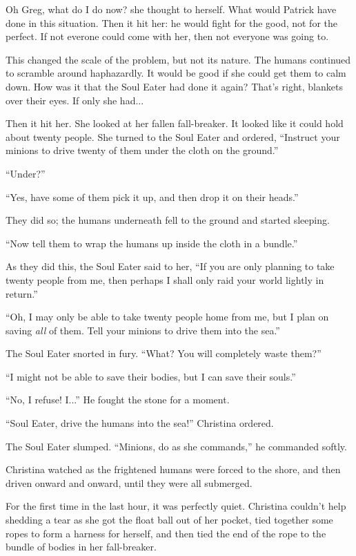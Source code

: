 \documentclass[showtrims,b6paper,draft,10pt]{memoir}
\begin{document}
Oh Greg, what do I do now?  she thought to herself.  What would Patrick have done in this situation.  Then it hit her:  he would fight for the good, not for the perfect.  If not everone could come with her, then not everyone was going to.

This changed the scale of the problem, but not its nature.  The humans continued to scramble around haphazardly.  It would be good if she could get them to calm down.  How was it that the Soul Eater had done it again?  That's right, blankets over their eyes.  If only she had...

Then it hit her.  She looked at her fallen fall-breaker.  It looked like it could hold about twenty people.  She turned to the Soul Eater and ordered, ``Instruct your minions to drive twenty of them under the cloth on the ground.''

``Under?''

``Yes, have some of them pick it up, and then drop it on their heads.''

They did so;  the humans underneath fell to the ground and started sleeping.

``Now tell them to wrap the humans up inside the cloth in a bundle.''

As they did this, the Soul Eater said to her, ``If you are only planning to take twenty people from me, then perhaps I shall only raid your world lightly in return.''

``Oh, I may only be able to take twenty people home from me, but I plan on saving \emph{all} of them.  Tell your minions to drive them into the sea.''

The Soul Eater snorted in fury.  ``What?  You will completely waste them?''

``I might not be able to save their bodies, but I can save their souls.''

``No, I refuse!  I...''  He fought the stone for a moment.

``Soul Eater, drive the humans into the sea!''  Christina ordered.

The Soul Eater slumped.  ``Minions, do as she commands,'' he commanded softly.

Christina watched as the frightened humans were forced to the shore, and then driven onward and onward, until they were all submerged.

For the first time in the last hour, it was perfectly quiet.  Christina couldn't help shedding a tear as she got the float ball out of her pocket, tied together some ropes to form a harness for herself, and then tied the end of the rope to the bundle of bodies in her fall-breaker.
\end{document}
